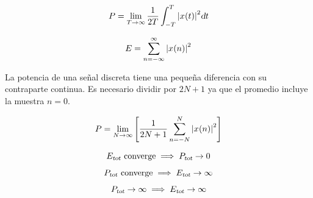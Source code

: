 \begin{mdframed}[style=PropertyFrame]
    \begin{defn}
    \end{defn}
    \begin{equation*}
        P = \lim_{T \to \infty} \frac{1}{2T} \int_{-T}^{T} \norm{\fx[x]{t}}^2 \dif t
    \end{equation*}
\end{mdframed}

\begin{mdframed}[style=PropertyFrame]
    \begin{defn}
    \end{defn}
    \begin{equation*}
        E = \sum_{n=-\infty}^{\infty} \norm{\fx[x]{n}}^2
    \end{equation*}
\end{mdframed}

La potencia de una señal discreta tiene una pequeña diferencia con su contraparte continua.
Es necesario dividir por $2N+1$ ya que el promedio incluye la muestra $n=0$.

\begin{mdframed}[style=PropertyFrame]
    \begin{defn}
    \end{defn}
    \begin{equation*}
        P = \lim_{N \to \infty} \inBrackets{\displaystyle \frac{1}{2N+1} \displaystyle \sum_{n=-N}^{N} \norm{\fx[x]{n}}^2}
    \end{equation*}
\end{mdframed}

\begin{mdframed}[style=PropertyFrame]
    \begin{prop}
    \end{prop}
    \begin{equation*}
        \sub{E}{tot} \text{ converge} \implies \sub{P}{tot} \to 0
    \end{equation*}
\end{mdframed}

\begin{mdframed}[style=PropertyFrame]
    \begin{prop}
    \end{prop}
    \begin{equation*}
        \sub{P}{tot} \text{ converge} \implies \sub{E}{tot} \to \infty
    \end{equation*}
\end{mdframed}

\begin{mdframed}[style=PropertyFrame]
    \begin{prop}
    \end{prop}
    \begin{equation*}
        \sub{P}{tot} \to \infty \implies \sub{E}{tot} \to \infty
    \end{equation*}
\end{mdframed}